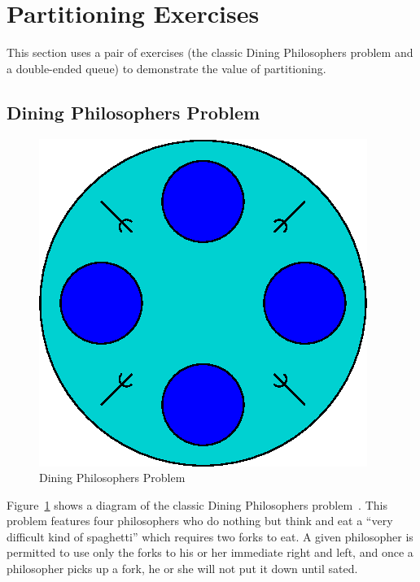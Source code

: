 
\section{Partitioning Exercises}
\label{sec:SMPdesign:Partitioning Exercises}

This section uses a pair of exercises (the classic Dining Philosophers
problem and a double-ended queue) to demonstrate the value of partitioning.

\subsection{Dining Philosophers Problem}
\label{sec:SMPdesign:Dining Philosophers Problem}

\begin{figure}[tb]
\begin{center}
\includegraphics{SMPdesign/DiningPhilosopher4}
\end{center}
\caption{Dining Philosophers Problem}
\label{fig:SMPdesign:Dining Philosophers Problem}
\end{figure}

Figure~\ref{fig:SMPdesign:Dining Philosophers Problem} shows a diagram
of the classic Dining Philosophers problem~\cite{Dijkstra1971HOoSP}.
This problem features four philosophers who do nothing but think and
eat a ``very difficult kind of spaghetti'' which requires two forks
to eat.
A given philosopher is permitted to use only the forks to his or her
immediate right and left, and once a philosopher picks up a fork,
he or she will not put it down until sated.

